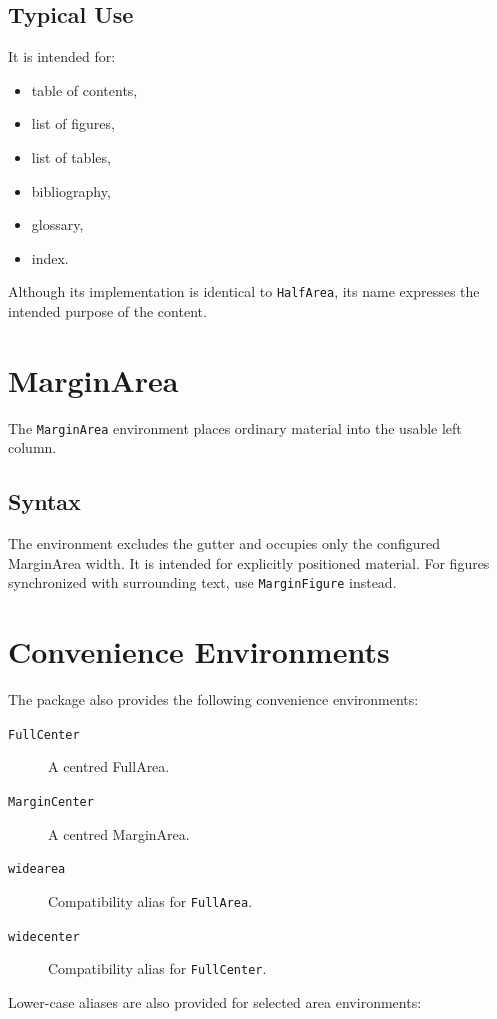 \documentclass[
11pt,
a4paper,
oneside
]{scrbook}
\begin{document}



\subsection{Typical Use}





It is intended for:
\begin{itemize}
	\item table of contents,
	\item list of figures,
	\item list of tables,
	\item bibliography,
	\item glossary,
	\item index.
\end{itemize}
Although its implementation is identical to \texttt{HalfArea}, its name
expresses the intended purpose of the content.

\section{MarginArea}

The \texttt{MarginArea} environment places ordinary material into the usable
left column.

\subsection{Syntax}





The environment excludes the gutter and occupies only the configured
MarginArea width.
It is intended for explicitly positioned material.
For figures synchronized with surrounding text, use
\texttt{MarginFigure} instead.

\section{Convenience Environments}

The package also provides the following convenience environments:
\begin{description}
	\item[\texttt{FullCenter}]
	A centred FullArea.
	
	\item[\texttt{MarginCenter}]
	A centred MarginArea.
	
	\item[\texttt{widearea}]
	Compatibility alias for \texttt{FullArea}.
	
	\item[\texttt{widecenter}]
	Compatibility alias for \texttt{FullCenter}.
\end{description}
Lower-case aliases are also provided for selected area environments:
\end{document}
